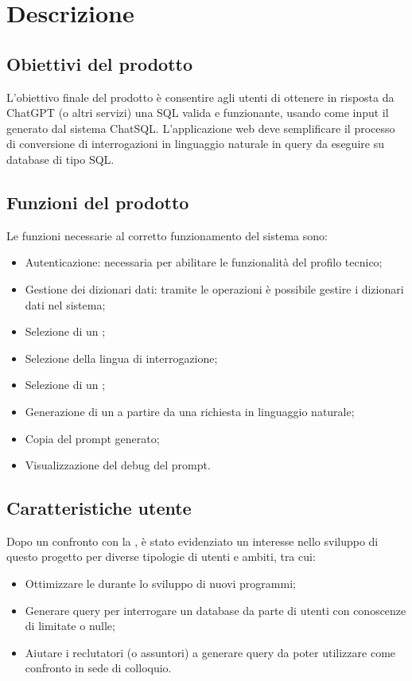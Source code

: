 \section{Descrizione}

\subsection{Obiettivi del prodotto}
\par L’obiettivo finale del prodotto è consentire agli utenti di ottenere in risposta da ChatGPT (o altri servizi) una  SQL valida e funzionante, usando come input il  generato dal sistema ChatSQL. L’applicazione web deve semplificare il processo di conversione di interrogazioni in linguaggio naturale in query da eseguire su database di tipo SQL.

\subsection{Funzioni del prodotto}
\par Le funzioni necessarie al corretto funzionamento del sistema sono:
\begin{itemize}
  \item Autenticazione: necessaria per abilitare le funzionalità del profilo tecnico;
  \item Gestione dei dizionari dati: tramite le operazioni  è possibile gestire i dizionari dati nel sistema;
  \item Selezione di un ;
  \item Selezione della lingua di interrogazione;
  \item Selezione di un ;
  \item Generazione di un  a partire da una richiesta in linguaggio naturale;
  \item Copia del prompt generato;
  \item Visualizzazione del debug del prompt.
\end{itemize}

\subsection{Caratteristiche utente}
Dopo un confronto con la , è stato evidenziato un interesse nello sviluppo di questo progetto per diverse tipologie di utenti e ambiti, tra cui:\\
\begin{itemize}
  \item Ottimizzare le  durante lo sviluppo di nuovi programmi;
  \item Generare query per interrogare un database da parte di utenti con conoscenze di  limitate o nulle;
  \item Aiutare i reclutatori (o assuntori) a generare query da poter utilizzare come confronto in sede di colloquio.
\end{itemize}